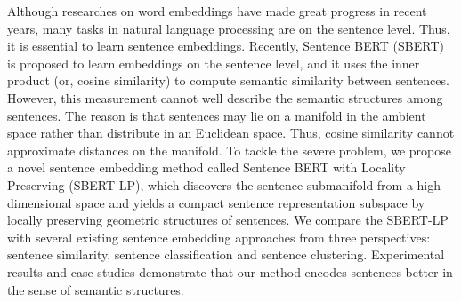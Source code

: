 Although researches on word embeddings have made great progress in recent years, many tasks in natural language processing are on the sentence level. Thus, it is essential to learn sentence embeddings. Recently, Sentence BERT (SBERT) is proposed to learn embeddings on the sentence level, and it uses the inner product (or, cosine similarity) to compute semantic similarity between sentences. However, this measurement cannot well describe the semantic structures among sentences. The reason is that sentences may lie on a manifold in the ambient space rather than distribute in an Euclidean space. Thus, cosine similarity cannot approximate distances on the manifold. To tackle the severe problem, we propose a novel sentence embedding method called Sentence BERT with Locality Preserving (SBERT-LP), which discovers the sentence submanifold from a high-dimensional space and yields a compact sentence representation subspace by locally preserving geometric structures of sentences. We compare the SBERT-LP with several existing sentence embedding approaches from three perspectives: sentence similarity, sentence classification and sentence clustering. Experimental results and case studies demonstrate that our method encodes sentences better in the sense of semantic structures.
